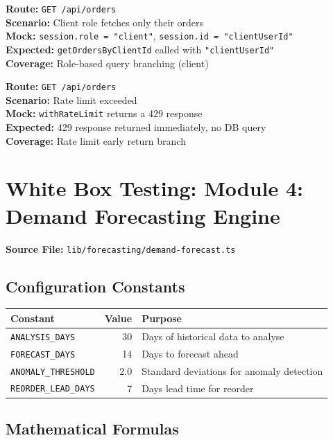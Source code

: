 \documentclass[12pt,onecolumn]{IEEEtran}
\let\oldsection\section
\renewcommand{\section}{\clearpage\oldsection}
\begin{document}
\textbf{Route:} \texttt{GET /api/orders} \\
\textbf{Scenario:} Client role fetches only their orders \\
\textbf{Mock:} \texttt{session.role = "client"}, \texttt{session.id = "clientUserId"} \\
\textbf{Expected:} \texttt{getOrdersByClientId} called with \texttt{"clientUserId"} \\
\textbf{Coverage:} Role-based query branching (client)



\textbf{Route:} \texttt{GET /api/orders} \\
\textbf{Scenario:} Rate limit exceeded \\
\textbf{Mock:} \texttt{withRateLimit} returns a 429 response \\
\textbf{Expected:} 429 response returned immediately, no DB query \\
\textbf{Coverage:} Rate limit early return branch





\section{White Box Testing: Module 4: Demand Forecasting Engine}


\textbf{Source File:} \texttt{lib/forecasting/demand-forecast.ts}

\subsection{Configuration Constants}

\begin{center}
\begin{tabular}{lrl}
  \toprule
  \textbf{Constant} & \textbf{Value} & \textbf{Purpose} \\
  \midrule
  \texttt{ANALYSIS\_DAYS}     & 30  & Days of historical data to analyse \\
  \texttt{FORECAST\_DAYS}     & 14  & Days to forecast ahead \\
  \texttt{ANOMALY\_THRESHOLD} & 2.0 & Standard deviations for anomaly detection \\
  \texttt{REORDER\_LEAD\_DAYS}& 7   & Days lead time for reorder \\
  \bottomrule
\end{tabular}
\end{center}

\subsection{Mathematical Formulas}
\end{document}
